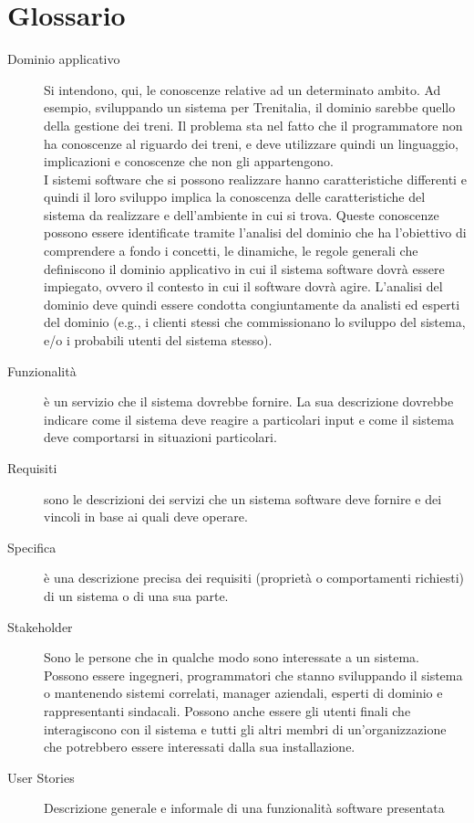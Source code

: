\documentclass{article}
\begin{document}
	\section{Glossario}
	\begin{description}
		\item[Dominio applicativo] Si intendono, qui, le conoscenze relative ad un determinato ambito. Ad esempio, sviluppando un sistema per Trenitalia, il dominio
		sarebbe quello della gestione dei treni. Il problema sta nel fatto che il programmatore non ha conoscenze al riguardo dei treni, e deve utilizzare quindi un linguaggio, implicazioni e conoscenze che non gli appartengono. \\
		I sistemi software che si possono realizzare hanno
		caratteristiche differenti e quindi il loro sviluppo implica la conoscenza
		delle caratteristiche del sistema da realizzare e dell’ambiente in cui si trova.
		Queste conoscenze possono essere identificate tramite l'analisi del
		dominio che ha l’obiettivo di comprendere a fondo i concetti, le dinamiche,
		le regole generali che definiscono il dominio applicativo in cui il sistema
		software dovrà essere impiegato, ovvero il contesto in cui il software dovrà
		agire. L'analisi del dominio deve quindi essere condotta congiuntamente
		da analisti ed esperti del dominio (e.g., i clienti stessi che commissionano
		lo sviluppo del sistema, e/o i probabili utenti del sistema stesso).
		\item[Funzionalità] è un servizio che il sistema dovrebbe fornire. La sua
		descrizione dovrebbe indicare come il sistema deve reagire a particolari
		input e come il sistema deve comportarsi in situazioni particolari.
		\item[Requisiti] sono le descrizioni dei servizi che un sistema software deve
		fornire e dei vincoli in base ai quali deve operare.
		\item[Specifica] è una descrizione precisa dei requisiti (proprietà o
		comportamenti richiesti) di un sistema o di una sua parte.
		\item[Stakeholder] Sono le persone che in qualche modo sono interessate a un
		sistema. Possono essere ingegneri, programmatori che stanno sviluppando
		il sistema o mantenendo sistemi correlati, manager aziendali, esperti di
		dominio e rappresentanti sindacali. Possono anche essere gli utenti finali
		che interagiscono con il sistema e tutti gli altri membri di un'organizzazione
		che potrebbero essere interessati dalla sua installazione.
		\item[User Stories] Descrizione generale e informale di una funzionalità software presentata

\end{description}
\end{document}
